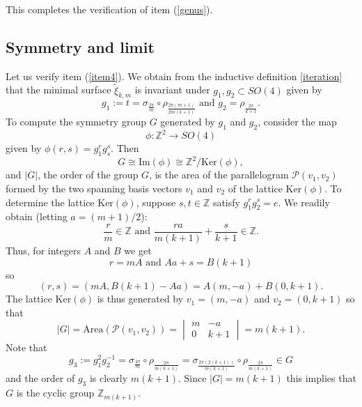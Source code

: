 \documentclass[11pt, reqno]{amsart}
\numberwithin{equation}{section}
\begin{document}
This completes the verification of item (\ref{genus}).


\subsection{Symmetry and limit}
Let us verify item (\ref{item4}). We obtain from the inductive definition \eqref{iteration} that the minimal surface $\tilde{\xi}_{k,m}$ is invariant under $g_1,g_2\subset SO(4)$ given by
\begin{equation}
g_1:=t=\sigma_{\frac{2\pi}{m}}\circ\rho_{\frac{2\pi(m+1)}{2m(k+1)}}\mbox{ and } g_2=\rho_{\frac{2\pi}{k+1}}.
\end{equation}  
\noindent
To compute the symmetry group $G$ generated by $g_1$ and $g_2$, consider the map
\begin{equation}
\phi:\mathbb{Z}^2\to SO(4) 
\end{equation}
given by $\phi(r,s)=g_1^rg_s^s$.  Then 
\begin{equation}
G\cong\mbox{Im}(\phi)\cong \mathbb{Z}^2/\mbox{Ker}(\phi), 
\end{equation}
and $|G|$, the order of the group $G$, is the area of the parallelogram $\mathcal{P}(v_1,v_2)$ formed by the two spanning basis vectors $v_1$ and $v_2$ of the lattice $\mbox{Ker}(\phi)$.
To determine the lattice $\mbox{Ker}(\phi)$, suppose $s,t\in\mathbb{Z}$ satisfy $g_1^rg_2^s=e$.  We readily obtain (letting $a=(m+1)/2$):
\begin{equation}
\frac{r}{m}\in\mathbb{Z}\mbox{ and } \frac{ra}{m(k+1)}+\frac{s}{k+1}\in\mathbb{Z}.
\end{equation}
Thus, for integers $A$ and $B$ we get
\begin{equation}
r=mA\mbox{ and } Aa+s=B(k+1)
\end{equation}
so
\begin{equation}
(r,s) = (mA, B(k+1)-Aa)=A(m,-a)+B(0,k+1).
\end{equation}
The lattice $\mbox{Ker}(\phi)$ is thus generated by $v_1=(m,-a)$ and $v_2=(0,k+1)$ so that 
\begin{equation}
|G|=\mbox{Area}(\mathcal{P}(v_1,v_2))= \begin{vmatrix}
m & -a \\
0 & k+1
\end{vmatrix}=m(k+1).
\end{equation}
Note that 
\begin{equation}\label{goodelement}
g_3:=g_1^2g_2^{-1}=\sigma_{\frac{4\pi}{m}}\circ\rho_{\frac{2\pi}{m(k+1)}}=\sigma_{\frac{2\pi(2(k+1))}{m(k+1)}}\circ\rho_{\frac{2\pi}{m(k+1)}}\in G
\end{equation}
and the order of $g_3$ is clearly $m(k+1)$. Since $|G|=m(k+1)$ this implies that $G$ is the cyclic group $\mathbb{Z}_{m(k+1)}$.  
\end{document}
